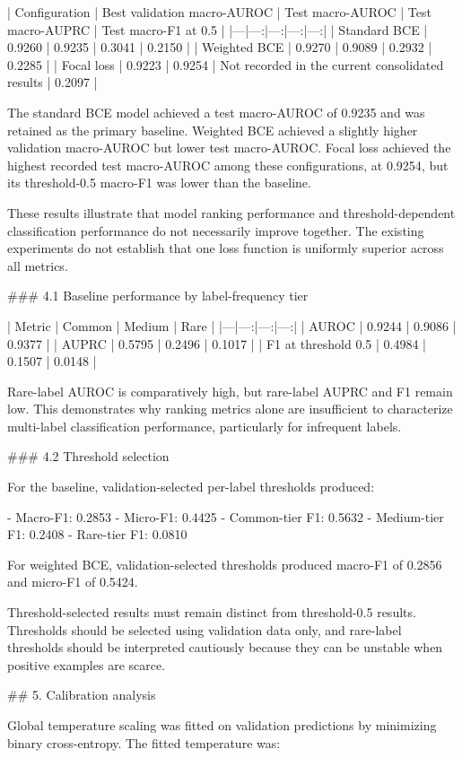 | Configuration | Best validation macro-AUROC | Test macro-AUROC | Test macro-AUPRC | Test macro-F1 at 0.5 |
|---|---:|---:|---:|---:|
| Standard BCE | 0.9260 | 0.9235 | 0.3041 | 0.2150 |
| Weighted BCE | 0.9270 | 0.9089 | 0.2932 | 0.2285 |
| Focal loss | 0.9223 | 0.9254 | Not recorded in the current consolidated results | 0.2097 |

The standard BCE model achieved a test macro-AUROC of 0.9235 and was retained as the primary baseline. Weighted BCE achieved a slightly higher validation macro-AUROC but lower test macro-AUROC. Focal loss achieved the highest recorded test macro-AUROC among these configurations, at 0.9254, but its threshold-0.5 macro-F1 was lower than the baseline.

These results illustrate that model ranking performance and threshold-dependent classification performance do not necessarily improve together. The existing experiments do not establish that one loss function is uniformly superior across all metrics.

### 4.1 Baseline performance by label-frequency tier

| Metric | Common | Medium | Rare |
|---|---:|---:|---:|
| AUROC | 0.9244 | 0.9086 | 0.9377 |
| AUPRC | 0.5795 | 0.2496 | 0.1017 |
| F1 at threshold 0.5 | 0.4984 | 0.1507 | 0.0148 |

Rare-label AUROC is comparatively high, but rare-label AUPRC and F1 remain low. This demonstrates why ranking metrics alone are insufficient to characterize multi-label classification performance, particularly for infrequent labels.

### 4.2 Threshold selection

For the baseline, validation-selected per-label thresholds produced:

- Macro-F1: 0.2853
- Micro-F1: 0.4425
- Common-tier F1: 0.5632
- Medium-tier F1: 0.2408
- Rare-tier F1: 0.0810

For weighted BCE, validation-selected thresholds produced macro-F1 of 0.2856 and micro-F1 of 0.5424.

Threshold-selected results must remain distinct from threshold-0.5 results. Thresholds should be selected using validation data only, and rare-label thresholds should be interpreted cautiously because they can be unstable when positive examples are scarce.

## 5. Calibration analysis

Global temperature scaling was fitted on validation predictions by minimizing binary cross-entropy. The fitted temperature was:

